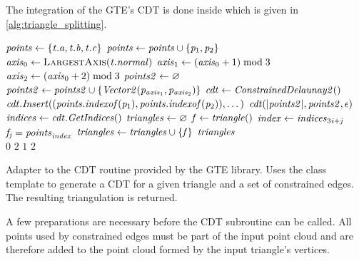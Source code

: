 The integration of the GTE's CDT is done inside  which is given in \cref{alg:triangle_splitting}.
%
\begin{algorithm}
	\centering
	\begin{algorithmic}[1]
			\State $\mathit{points} \gets \{\mathit{t}.\mathit{a}, \mathit{t}.\mathit{b}, \mathit{t}.\mathit{c}\}$ 
				\State $\mathit{points} \gets \mathit{points} \cup \{\mathit{p}_1, \mathit{p}_2\}$
			\EndFor
			\State $\var{axis}_0 \gets \Call{LargestAxis}{\var{t}.\var{normal}}$
			\State $\mathit{axis}_1 \gets (\mathit{axis}_0 + 1) \bmod 3$
			\State $\mathit{axis}_2 \gets (\mathit{axis}_0 + 2) \bmod 3$
			\State $\mathit{points2} \gets \varnothing$ 
				\State $\mathit{points2} \gets \mathit{points2} \cup \{\mathit{Vector2}(\mathit{p}_{\mathit{axis}_1}, \mathit{p}_{\mathit{axis}_2})\}$
			\EndFor
			\State $\mathit{cdt} \gets \mathit{ConstrainedDelaunay2()}$
			 
				\State $\mathit{cdt}.\mathit{Insert}((\mathit{points}.\mathit{indexof}(\mathit{p}_1), \mathit{points}.\mathit{indexof}(\mathit{p}_2)), \dots)$
			\EndFor
			\State $\mathit{cdt}(|\mathit{points2}|, \mathit{points2}, \epsilon)$ 
			\State $\mathit{indices} \gets \mathit{cdt}.\mathit{GetIndices}()$
			\State $\mathit{triangles} \gets \varnothing$
				\State $\mathit{f} \gets \mathit{triangle()}$
					\State $\mathit{index} \gets \mathit{indices}_{3\mathit{i} + \mathit{j}}$
					\State $\mathit{f}_{\mathit{j}} = \mathit{points}_{\mathit{index}}$
				\EndFor
				\State $\mathit{triangles} \gets \mathit{triangles} \cup \{\mathit{f}\}$
			\EndFor
			\State \Return $\mathit{triangles}$
		\EndFunction
		\\
					\State \Return $0$
				\Else
					\State \Return $2$
				\EndIf
			\Else
					\State \Return $1$
				\Else
					\State \Return $2$
				\EndIf
			\EndIf
		\EndFunction
	\end{algorithmic}
	\caption{
		Adapter to the CDT routine provided by the GTE library.
		Uses the  class template to generate a CDT for a given triangle and a set of constrained edges.
		The resulting triangulation is returned.
	}
	\label{alg:triangle_splitting}
\end{algorithm}
%
A few preparations are necessary before the CDT subroutine can be called.
All points used by constrained edges must be part of the input point cloud and are therefore added to the point cloud formed by the input triangle's vertices.

